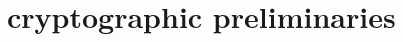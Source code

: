 \section{cryptographic preliminaries}
\begin{comment}
\subsection{Commitment scheme} \label{app:DefCommitment}
\begin{definition}\label{defn:commscheme}
 A pair of $\ppt$ algorithms $(\gen,\com)$ constitute a non-interactive commitment scheme if $\sigma\sample \gen(\secparam)$ consists of description of sets $\calM_\sigma$ (message space), $\calR_\sigma$ (randomness space), $\calC_\sigma$ (commitment space) and an efficiently computable function $\com_\sigma: \calM_\sigma\times \calR_\sigma\rightarrow \calC_\sigma$ which is {\em hiding} and {\em binding} as defined later.
\end{definition}

For $x\in \calM_\sigma$, we generate a {\em commitment} of $x$ as $\com_\sigma(x,r)$ where $r\sample \calR_\sigma$ is drawn uniformly at random. For ease of notation, we simply use $\com$ instead of $\com_\sigma$ and use $\com(x)$ to denote the random variable corresponding to commitment of $x$. 

\begin{definition}[Hiding Commitment]\label{defn:hidingcomm}
A commitment scheme $(\gen,\com)$ is called perfectly {\em hiding}  if for all adversaries $\adv$, the following probability is  $1/2$:
{\small
\begin{align*}
\condprob{b=b'}{
\begin{array}{l}
\sigma\gets \gen(\secparam); \\
(x_0,x_1)\in \calM^2_p\gets \adv(\sigma); \\
b\sample \bitset; c\gets \com(x_b);\\
b'\gets \adv(\secparam,\sigma,c)
\end{array}
}
\end{align*}
}
\end{definition}

\begin{definition}[Binding Commitment]\label{defn:bindingcomm}
A commitment scheme $(\gen,\com)$ is called {\em binding} if for all $\ppt$  $\adv$, 
{\small
\begin{align*}
\condprob{
	\begin{array}{c}
	\com_\sigma(x_0,r_0)=\com_\sigma(x_1,r_1)\\
	\wedge x_0\neq x_1
\end{array}}{
\begin{array}{l}
\sigma \gets \gen(\secparam) \\
x_0,x_1,r_0,r_1 \gets \adv(\secparam,\sigma)
\end{array}
}\\
 < \negl(\lambda)
\end{align*}
}


\end{comment}
